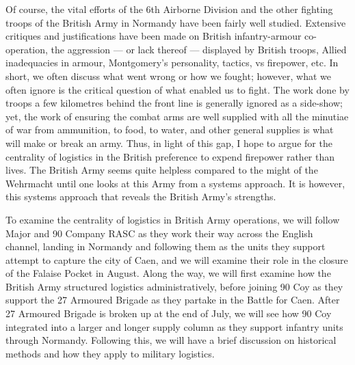 \documentclass[noraggedright]{turabian-researchpaper}
\begin{document}




Of course, the vital efforts of the 6th Airborne Division and the other 
fighting troops of the British Army in Normandy have been fairly well studied.
Extensive critiques and justifications have been made on British 
infantry-armour co-operation, the aggression --- or lack thereof --- displayed
by British troops, Allied inadequacies in armour, Montgomery's personality,
tactics, vs firepower, etc.  In short, we often discuss what went wrong or 
how we fought; however, what we often ignore is the critical question of what
enabled us to fight. The work done by troops a few kilometres behind the front 
line is generally ignored as a side-show; yet, the work of ensuring the combat 
arms are well supplied with all the minutiae of war from ammunition, to food, 
to water, and other general supplies is what will make or break an army. Thus,
in light of this gap, I hope to argue for the centrality of logistics in the
British preference to expend firepower rather than lives.  The British Army
seems quite helpless compared to the might of the Wehrmacht until one looks
at this Army from a systems approach.  It is however, this systems approach
that reveals the British Army's strengths.  %

To examine the centrality of logistics in British Army operations, we will 
follow Major %
and 90 Company RASC as they work their way across the English channel, landing
in Normandy and following them as the units they support attempt to capture the
city of Caen, and we will examine their role in the closure of the Falaise 
Pocket in August.  Along the way, we will first examine how the British Army 
structured logistics administratively, before joining 90 Coy as they support
the 27 Armoured Brigade as they partake in the Battle for Caen.  
After 27 Armoured Brigade is broken up at the end of July,
we will see how 90 Coy integrated into a larger and longer supply column as
they support infantry units through Normandy. Following this, we will have 
a brief discussion on historical methods and how they apply to military 
logistics.  %
\end{document}
